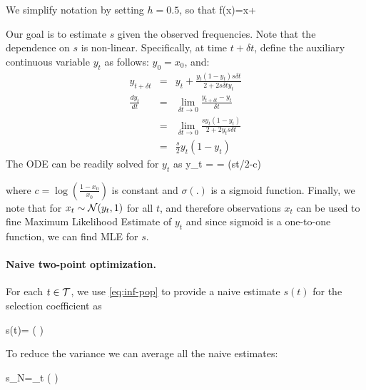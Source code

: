 We simplify notation by setting $h=0.5$, so that
\beq
f(x)=x+
\eeq

Our goal is to estimate $s$ given the observed frequencies. Note that
the dependence on $s$ is non-linear. Specifically, at time $t+\delta
t$, define the auxiliary continuous variable $y_t$ as follows:
$y_0=x_0$, and:
\begin{eqnarray}
  y_{t+\delta t} &=& y_t+\frac{y_t(1-y_t)s\delta t}{2+2s\delta t y_t}\\
  \frac{dy_t}{dt} &=&\lim_{\delta t\rightarrow 0}\frac{y_{t+\delta t} -y_t}{\delta t}\\
   &=&\lim_{\delta t\rightarrow 0}\frac{sy_t(1-y_t)}{2+2y_ts\delta t}\\
   &=& \frac{s}{2}y_t(1-y_t) 
  \label{eq:ode}
\end{eqnarray}
The ODE can be readily solved for $y_t$ as
\beq
y_t = = \sigma(st/2-c) 
\label{eq:inf-pop} 
\eeq

where $c=\log\left(\frac{1-x_0}{x_0}\right)$ is constant
\cite{multilocus-hitchhike} and $\sigma(.)$ is a sigmoid
function. Finally, we note that for $x_t\sim{\cal N}(y_t,1)$ for all $t$, 
and therefore observations $x_t$ can be used to fine Maximum Likelihood Estimate of $y_t$ and since sigmoid is a one-to-one function, we can find MLE for 
$s$.

\paragraph{Naive two-point optimization.} 
For each $t\in {\cal T}$, we use \eqref{eq:inf-pop} to provide a naive
estimate $s(t)$ for the selection coefficient as

\beq 
s(t)= \log \left(  \right) 
\eeq

To reduce the variance we can average all the naive estimates: 

\beq
s_{N}=\sum_{t\in \Tc} \log \left(  \right) 
\label{eq:naive}
\eeq


